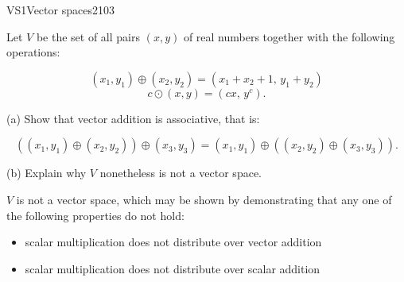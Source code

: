 \begin{exercise}{VS1}{Vector spaces}{2103} 
\begin{exerciseStatement} 

 Let \(V\) be the set of all pairs \((x,y)\) of real numbers together with the following operations: 

 \[(x_1,y_1)\oplus (x_2,y_2)=\left(x_{1} + x_{2} + 1,\,y_{1} + y_{2}\right)\]\[c \odot (x,y) =\left(c x,\,y^{c}\right).\] 

 (a) Show that vector addition is associative, that is: 

 \[
      \left((x_1,y_1)\oplus(x_2,y_2)\right)\oplus(x_3,y_3)=(x_1,y_1)\oplus\left((x_2,y_2)\oplus(x_3,y_3)\right).
    \] 

 (b) Explain why \(V\) nonetheless is not a vector space. 

 \end{exerciseStatement}
 \begin{exerciseAnswer} 

 \(V\) is not a vector space, which may be shown by demonstrating that any one of the following properties do not hold: 

 

\begin{itemize}
\item scalar multiplication does not distribute over vector addition
\item scalar multiplication does not distribute over scalar addition
\end{itemize}

     \end{exerciseAnswer}
 \end{exercise}


